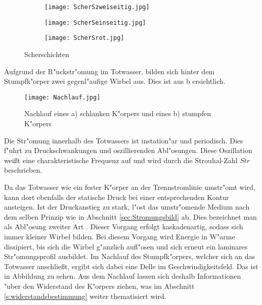 \begin{figure}[h]
	\centering
	\begin{subfigure}[c]{0.35\textwidth}
		\texttt{[image: ScherSzweiseitig.jpg]}
		\label{fig:Scherungzweiseitig}
	\end{subfigure}
	\begin{subfigure}[c]{0.35\textwidth}		
		\texttt{[image: ScherSeinseitig.jpg]}
		\label{fig:Scherungeinseitig}
	\end{subfigure}
	\begin{subfigure}[c]{0.35\textwidth}
		\texttt{[image: ScherSrot.jpg]}
		\label{fig:Scherungrotatorisch}
	\end{subfigure}
	\caption{ Scherschichten \cite{Hucho.2011}}
	\label{fig:Scherschichten}
\end{figure}


Aufgrund der R"uckstr"omung im Totwasser, bilden sich hinter dem Stumpfk"orper zwei gegenl"aufige Wirbel aus. Dies ist aus b ersichtlich. 

 \begin{figure}[h]
	\centering
	\texttt{[image: Nachlauf.jpg]}
	\caption{Nachlauf eines a) schlanken K"orpers und eines b) stumpfen K"orpers \cite{Hucho.2011}}
	\label{fig:Nachlauf}
\end{figure}

Die Str"omung innerhalb des Totwassers ist instation"ar und periodisch. Dies f"uhrt zu Druckschwankungen und oszillierenden Abl"osungen. Diese Oszillation wei\ss{}t eine charakteristische Frequenz auf und wird durch die Strouhal-Zahl ${Str}$ beschrieben. 

Da das Totwasser wie ein fester K"orper an der Trennstromlinie umstr"omt wird, kann dort ebenfalls der statische Druck bei einer entsprechenden Kontur ansteigen. Ist der Druckanstieg zu stark, l"ost das umstr"omende Medium nach dem selben Prinzip wie in Abschnitt \ref{sec:Stromungsbild} ab. Dies bezeichnet man als Abl"osung zweiter Art \cite{Leder.1992}. Dieser Vorgang erfolgt kaskadenartig, sodass sich immer kleiner Wirbel bilden. Bei diesem Vorgang wird Energie  in W"arme dissipiert, bis sich die Wirbel g"anzlich aufl"osen und sich erneut ein laminares Str"omungsprofil ausbildet. Im Nachlauf des Stumpfk"orpers, welcher sich an das Totwasser anschlie\ss{}t, ergibt sich dabei eine Delle im Geschwindigkeitsfeld. Das ist in Abbildung  zu sehen. Aus dem Nachlauf lassen sich deshalb Informationen "uber den Widerstand des K"orpers ziehen, was im Abschnitt \ref{s:widerstandsbestimmung} weiter thematisiert wird.







